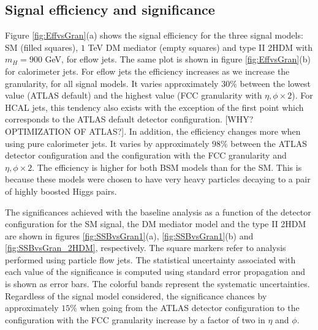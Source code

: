 
\subsection{Signal efficiency and significance}

Figure \ref{fig:EffvsGran}(a) shows the signal efficiency for the three signal models: SM (filled squares), $1$ TeV DM mediator (empty squares) and type II 2HDM with $m_H=900$ GeV, for eflow jets. The same plot is shown in figure \ref{fig:EffvsGran}(b) for calorimeter jets. 
For eflow jets the efficiency increases as we increase the granularity, for all signal models. It varies approximately $30\%$ between the lowest value (ATLAS default) and the highest value (FCC granularity with $\eta,\phi\times 2$). For HCAL jets, this tendency also exists with the exception of the first point which corresponds to the ATLAS default detector configuration. [WHY? OPTIMIZATION OF ATLAS?]. In addition, the efficiency changes more when using pure calorimeter jets. It varies by approximately $98\%$ between the ATLAS detector configuration and the configuration with the FCC granularity and $\eta,\phi\times 2$.
The efficiency is higher for both BSM models than for the SM. This is because these models were chosen to have very heavy particles decaying to a pair of highly boosted Higgs pairs.

The significances achieved with the baseline analysis as a function of the detector configuration for the SM signal, the DM mediator model and the type II 2HDM are shown in figures \ref{fig:SSBvsGran1}(a), \ref{fig:SSBvsGran1}(b) and \ref{fig:SSBvsGran_2HDM}, respectively. The square markers refer to analysis performed using particle flow jets. The statistical uncertainty associated with each value of the significance is computed using standard error propagation and is shown as error bars. The colorful bands represent the systematic uncertainties.
Regardless of the signal model considered, the significance chances by approximately $15\%$ when going from the ATLAS detector configuration to the configuration with the FCC granularity increase by a factor of two in $\eta$ and $\phi$.

